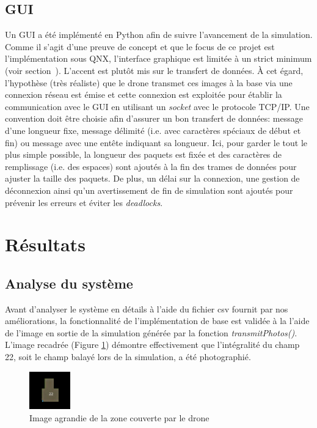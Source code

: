 \documentclass[journal]{IEEEtran}
\begin{document}
\subsection{GUI}
Un GUI a été implémenté en Python afin de suivre l'avancement de la simulation. Comme il s'agit d'une preuve de concept et que le focus de ce projet est l'implémentation sous QNX, l'interface graphique est limitée à un strict minimum (voir section~). L'accent est plutôt mis sur le transfert de données. À cet égard, l'hypothèse (très réaliste) que le drone transmet ces images à la base via une connexion réseau est émise et cette connexion est exploitée pour établir la communication avec le GUI en utilisant un \textit{socket} avec le protocole TCP/IP. Une convention doit être choisie afin d'assurer un bon transfert de données: message d'une longueur fixe, message délimité (i.e. avec caractères spéciaux de début et fin) ou  message avec une entête indiquant sa longueur. Ici, pour garder le tout le plus simple possible, la longueur des paquets est fixée et des caractères de remplissage (i.e. des espaces) sont ajoutés à la fin des trames de données pour ajuster la taille des paquets. De plus, un délai sur la connexion, une gestion de déconnexion ainsi qu'un avertissement de fin de simulation sont ajoutés pour prévenir les erreurs et éviter les \textit{deadlocks}.

\section{Résultats}\label{resultats}

\subsection{Analyse du système}
Avant d'analyser le système en détails à l'aide du fichier csv fournit par nos améliorations, la fonctionnalité de l'implémentation de base est validée à la l'aide de l'image en sortie de la simulation générée par la fonction \textit{transmitPhotos()}. L'image recadrée (Figure \ref{fig:farmMap}) démontre effectivement que l'intégralité du champ 22, soit le champ balayé lors de la simulation, a été photographié.

\begin{figure}
	\centering
	\captionsetup{justification=centering}
	\includegraphics[width=0.7in]{farmMap.png}
	\caption{Image agrandie de la zone couverte par le drone}
	\label{fig:farmMap}
\end{figure}
\end{document}
